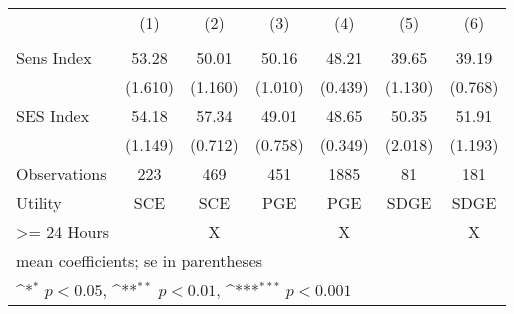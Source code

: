 {
\def\sym#1{\ifmmode^{#1}\else\(^{#1}\)\fi}
\begin{tabular}{l*{6}{c}}
\hline\hline
                    &\multicolumn{1}{c}{(1)}&\multicolumn{1}{c}{(2)}&\multicolumn{1}{c}{(3)}&\multicolumn{1}{c}{(4)}&\multicolumn{1}{c}{(5)}&\multicolumn{1}{c}{(6)}\\
                    &\multicolumn{1}{c}{} &\multicolumn{1}{c}{} &\multicolumn{1}{c}{} &\multicolumn{1}{c}{} &\multicolumn{1}{c}{} &\multicolumn{1}{c}{} \\
\hline
Sens Index          &       53.28         &       50.01         &       50.16         &       48.21         &       39.65         &       39.19         \\
                    &     (1.610)         &     (1.160)         &     (1.010)         &     (0.439)         &     (1.130)         &     (0.768)         \\
[1em]
SES Index           &       54.18         &       57.34         &       49.01         &       48.65         &       50.35         &       51.91         \\
                    &     (1.149)         &     (0.712)         &     (0.758)         &     (0.349)         &     (2.018)         &     (1.193)         \\
\hline
Observations        &         223         &         469         &         451         &        1885         &          81         &         181         \\
Utility             &         SCE         &         SCE         &         PGE         &         PGE         &        SDGE         &        SDGE         \\
>= 24 Hours         &                     &           X         &                     &           X         &                     &           X         \\
\hline\hline
\multicolumn{7}{l}{\footnotesize mean coefficients; se in parentheses}\\
\multicolumn{7}{l}{\footnotesize \sym{*} \(p<0.05\), \sym{**} \(p<0.01\), \sym{***} \(p<0.001\)}\\
\end{tabular}
}
